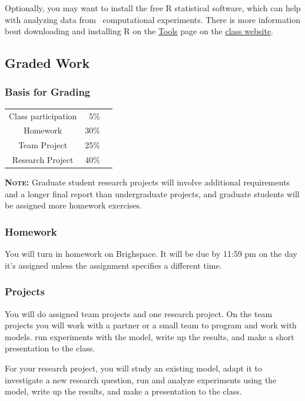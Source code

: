 \documentclass[11pt,twoside]{jgsyllabus}\usepackage[]{graphicx}\usepackage[]{xcolor}
\begin{document}
Optionally, you may want to install the free R statistical software, which can
help with analyzing data from \NetLogo\ computational experiments. There is more
information bout downloading and installing R on the
\href{https://ees4760.jmgilligan.org/tools}{Tools} page on the
\href{https://ees4760.jmgilligan.org}{class website}.

\subsection{Graded Work}
%
%
%
\subsubsection[Grading]{Basis for Grading}
\begin{center}
	\begin{tabular}[t]{crr}
		Class participation & 5\% &\\
		Homework & 30\% &\\
		Team Project & 25\% &\\
		Research Project & 40\% &
	\end{tabular}
\end{center}

\textbf{\scshape Note:} Graduate student research projects will involve
additional requirements and a longer final report than undergraduate projects,
and graduate students will be assigned more homework exercises.

\subsubsection{Homework}
You will turn in homework on Brighspace. It will be due by 11:59 pm on the day
it's assigned unless the assignment specifies a different time.
%
\subsubsection{Projects}
You will do assigned team projects and one research project.
On the team projects you will work with a partner or a small team to program
and work with models.
run experiments with the model, write up the results, and make a short
presentation to the class.

For your research project, you will study an existing model, adapt it to
investigate a new research question, run and analyze experiments using the
model, write up the results, and make a presentation to the class.
\end{document}

